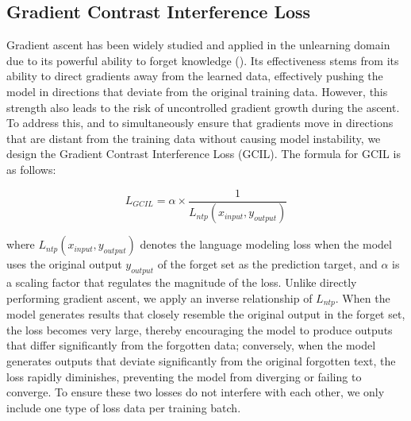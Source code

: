 \documentclass[11pt]{article}
\begin{document}
\subsection{Gradient Contrast Interference Loss}
Gradient ascent has been widely studied and applied in the unlearning domain due to its powerful ability to forget knowledge (\citet{veldanda2024llm}). Its effectiveness stems from its ability to direct gradients away from the learned data, effectively pushing the model in directions that deviate from the original training data. However, this strength also leads to the risk of uncontrolled gradient growth during the ascent. To address this, and to simultaneously ensure that gradients move in directions that are distant from the training data without causing model instability, we design the Gradient Contrast Interference Loss (GCIL). The formula for GCIL is as follows:

\begin{equation}
L_{GCIL}=\alpha  \times  \frac{1}{L_{ntp}(x_{input},y_{output})}
\end{equation}

where $L_{ntp}(x_{input},y_{output})$ denotes the language modeling loss when the model uses the original output $y_{output}$ of the forget set as the prediction target, and $\alpha$ is a scaling factor that regulates the magnitude of the loss. Unlike directly performing gradient ascent, we apply an inverse relationship of $L_{ntp}$. When the model generates results that closely resemble the original output in the forget set, the loss becomes very large, thereby encouraging the model to produce outputs that differ significantly from the forgotten data; conversely, when the model generates outputs that deviate significantly from the original forgotten text, the loss rapidly diminishes, preventing the model from diverging or failing to converge. To ensure these two losses do not interfere with each other, we only include one type of loss data per training batch.
\end{document}
